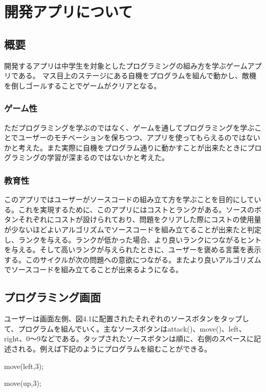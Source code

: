 \documentclass[openany,11pt,papersize]{jsbook}
\begin{document}


\chapter{開発アプリについて}
\section{概要}
開発するアプリは中学生を対象としたプログラミングの組み方を学ぶゲームアプリである。
マス目上のステージにある自機をプログラムを組んで動かし、敵機を倒しゴールすることでゲームがクリアとなる。

\subsection{ゲーム性}
ただプログラミングを学ぶのではなく、ゲームを通してプログラミングを学ぶことでユーザーのモチベーションを保ちつつ、アプリを使ってもらえるのではないかと考えた。また実際に自機をプログラム通りに動かすことが出来たときにプログラミングの学習が深まるのではないかと考えた。
 

\subsection{教育性}
このアプリではユーザーがソースコードの組み立て方を学ぶことを目的にしている。これを実現するために、このアプリにはコストとランクがある。ソースのボタンそれぞれにコストが設けられており、問題をクリアした際にコストの使用量が少ないほどよいアルゴリズムでソースコードを組み立てることが出来たと判定し、ランクを与える。ランクが低かった場合、より良いランクにつながるヒントを与える。そして高いランクが与えられたときに、ユーザーを褒める言葉を表示する。このサイクルが次の問題への意欲につながる。またより良いアルゴリズムでソースコードを組み立てることが出来るようになる。

\section{プログラミング画面}

ユーザーは画面左側、図4.1に配置されたそれぞれのソースボタンをタップして、プログラムを組んでいく。主なソースボタンはattack()、move()、left、right、0〜9などである。タップされたソースボタンは順に、右側のスペースに記述される。例えば下記のようにプログラムを組むことができる。
\par move(left,3);
\par move(up,3);
\end{document}
